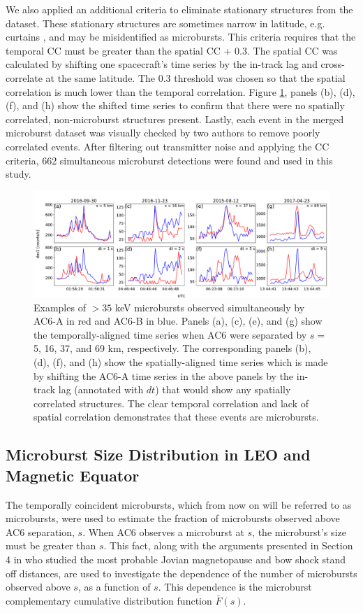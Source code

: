 \documentclass[draft]{agujournal2019}
\begin{document}
We also applied an additional criteria to eliminate stationary structures from the dataset. These stationary structures are sometimes narrow in latitude, e.g. curtains \cite{Blake2016}, and may be misidentified as microbursts. This criteria requires that the temporal CC must be greater than the spatial CC + 0.3. The spatial CC was calculated by shifting one spacecraft's time series by the in-track lag and cross-correlate at the same latitude. The 0.3 threshold was chosen so that the spatial correlation is much lower than the temporal correlation. Figure \ref{fig2}, panels (b), (d), (f), and (h) show the shifted time series to confirm that there were no spatially correlated, non-microburst structures present. Lastly, each event in the merged microburst dataset was visually checked by two authors to remove poorly correlated events. After filtering out transmitter noise and applying the CC criteria, 662 simultaneous microburst detections were found and used in this study.

\begin{figure}
\includegraphics[width=\textwidth]{fig2.pdf}
\caption{Examples of $>35$ keV microbursts observed simultaneously by AC6-A in red and AC6-B in blue. Panels (a), (c), (e), and (g) show the temporally-aligned time series when AC6 were separated by $s=$ 5, 16, 37, and 69 km, respectively. The corresponding panels (b), (d), (f), and (h) show the spatially-aligned time series which is made by shifting the AC6-A time series in the above panels by the in-track lag (annotated with $dt$) that would show any spatially correlated structures. The clear temporal correlation and lack of spatial correlation demonstrates that these events are microbursts.} 
\label{fig2}
\end{figure}
	

\subsection{Microburst Size Distribution in LEO and Magnetic Equator}\label{microburst_distribution}
The temporally coincident microbursts, which from now on will be referred to as microbursts, were used to estimate the fraction of microbursts observed above AC6 separation, $s$. When AC6 observes a microburst at $s$, the microburst's size must be greater than $s$. This fact, along with the arguments presented in Section 4 in  who studied the most probable Jovian magnetopause and bow shock stand off distances, are used to investigate the dependence of the number of microbursts observed above $s$, as a function of $s$. This dependence is the microburst complementary cumulative distribution function $\bar{F}(s)$. 
\end{document}
